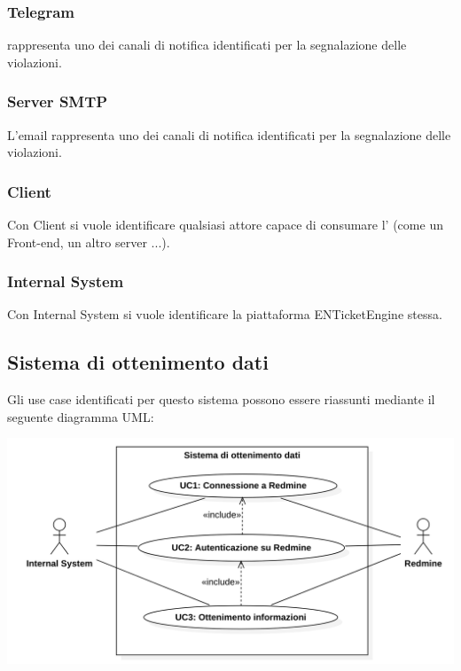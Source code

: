 \subsubsection{Telegram}
 rappresenta uno dei canali di notifica identificati per la segnalazione delle violazioni.
\subsubsection{Server SMTP}
L'email rappresenta uno dei canali di notifica identificati per la segnalazione delle violazioni.
\subsubsection{Client}
Con Client si vuole identificare qualsiasi attore capace di consumare l'  (come un Front-end, un altro server ...).
\subsubsection{Internal System}
Con Internal System si vuole identificare la piattaforma ENTicketEngine stessa.


\subsection{Sistema di ottenimento dati}
Gli use case identificati per questo sistema possono essere riassunti mediante il seguente diagramma UML:
\begin{center}
	\includegraphics[keepaspectratio = true, width=15cm]{immagini/uc/1.png}
\end{center}
